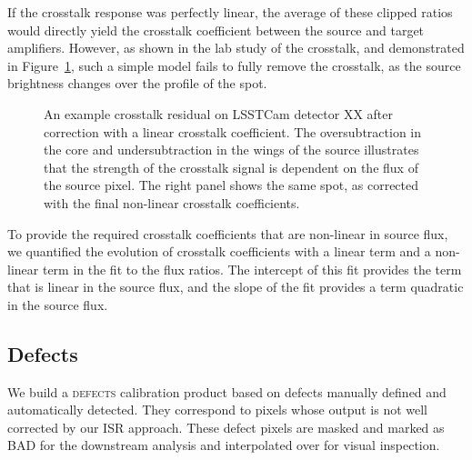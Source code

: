 If the crosstalk response was perfectly linear, the average of these clipped ratios would directly yield the crosstalk coefficient between the source and target amplifiers.
However, as shown in the lab study of the crosstalk, and demonstrated in Figure~\ref{fig:crosstalk-linear-nonlinear-fit}, such a simple model fails to fully remove the crosstalk, as the source brightness changes over the profile of the spot.

\begin{figure}[t]
    \centering
    \caption{An example crosstalk residual on LSSTCam detector XX after correction with a linear crosstalk coefficient.
      The oversubtraction in the core and undersubtraction in the wings of the source illustrates that the strength of the crosstalk signal is dependent on the flux of the source pixel.
      The right panel shows the same spot, as corrected with the final non-linear crosstalk coefficients.}
    \label{fig:crosstalk-linear-nonlinear-fit}
\end{figure}

To provide the required crosstalk coefficients that are non-linear in source flux, we quantified the evolution of crosstalk coefficients with a linear term and a non-linear term in the fit to the flux ratios.
The intercept of this fit provides the term that is linear in the source flux, and the slope of the fit provides a term quadratic in the source flux.

\subsection{Defects} \label{sec:processing:calibration:defects}

We build a \textsc{defects} calibration product based on defects manually defined and automatically detected.
They correspond to pixels whose output is not well corrected by our ISR approach.
These defect pixels are masked and marked as \textsc{BAD} for the downstream analysis and interpolated over for visual inspection.

